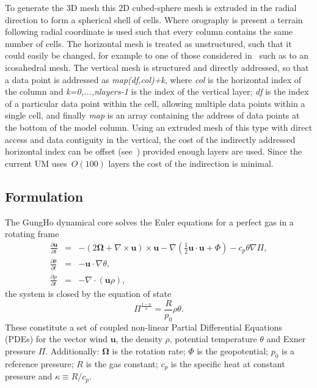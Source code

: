 \documentclass[review,times]{elsarticle}
\begin{document}
To generate the 3D mesh this 2D cubed-sphere mesh is extruded in the radial 
direction to form a spherical shell of cells. Where orography is present a terrain
following radial coordinate is used such that every column contains the
same number of cells. The horizontal mesh is treated as unstructured,
such that it could easily be changed, for example to one of those considered 
in~\cite{staniforth2012} such as to an icosahedral mesh.
The vertical mesh is structured and directly addressed, so that
a data point is addressed as \textit{map(df,col)+k}, where \textit{col}
is the horizontal index of the column and \textit{k=0,...,nlayers-1} is
the index of the vertical layer; \textit{df} is the index of a particular
data point within the cell, allowing multiple data points within a single cell, and 
finally \textit{map} is an array containing the address of data points at 
the bottom of the model column.
Using an extruded mesh of this type with direct access and data contiguity
in the vertical, the cost of the indirectly addressed horizontal index can 
be offset (see~\cite{gmd-9-3803-2016}) provided enough layers are used. 
Since the current UM uses~$O(100)$ layers the cost of the indirection is minimal.
%

\subsection{Formulation\label{sec:sub:formulation}}
The GungHo dynamical core solves the Euler equations for a perfect gas in a 
rotating frame
%
\begin{eqnarray}
\frac{\partial\mathbf{u}}{\partial t} & = & -\left(2\bm{\Omega}+\nabla\times\mathbf{u}\right)\times\mathbf{u} - \nabla\left(\frac{1}{2}\mathbf{u}\cdot\mathbf{u} + \Phi\right) - c_p\theta\nabla\Pi,\label{eq:momentum}\\
\frac{\partial\theta}{\partial t} & = & - \mathbf{u}\cdot\nabla\theta,\label{eq:energy}\\
\frac{\partial\rho}{\partial t} & = & - \nabla\cdot\left(\mathbf{u}\rho\right)\label{eq:continuity},
\end{eqnarray}
%
the system is closed by the equation of state
%
\begin{equation}
\Pi^{\frac{1-\kappa}{\kappa}} = \frac{R}{p_0}\rho\theta.\label{eq:eos}
\end{equation}
%
These constitute a set of coupled non-linear Partial Differential
Equations (PDEs) for the vector wind $\mathbf{u}$, 
the density $\rho$, potential temperature $\theta$ and Exner pressure $\Pi$. 
Additionally: $\bm{\Omega}$ is the rotation rate; $\Phi$ is the geopotential; 
$p_0$ is a reference pressure; $R$ is the gas constant; $c_p$ is the specific 
heat at constant pressure and $\kappa\equiv R/c_p$.
\end{document}

